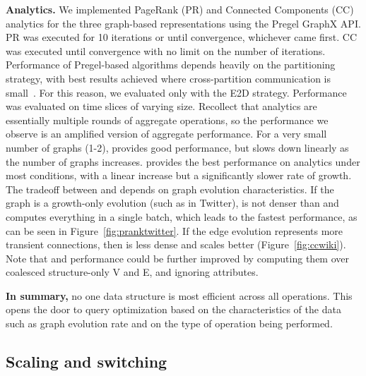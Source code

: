 {\bf Analytics.}  We implemented PageRank (PR) and Connected
Components (CC) analytics for the three graph-based representations
using the Pregel GraphX API.  PR was executed for 10 iterations or
until convergence, whichever came first. CC was executed until
convergence with no limit on the number of iterations.  Performance of
Pregel-based algorithms depends heavily on the partitioning strategy,
with best results achieved where cross-partition communication is
small~\cite{MoffittTempWeb16}.  For this reason, we evaluated only
with the E2D strategy.
%
Performance was evaluated on time slices of varying size.  Recollect
that analytics are essentially multiple rounds of aggregate
operations, so the performance we observe is an amplified version of
aggregate performance.  For a very small number of graphs (1-2), \sg
provides good performance, but slows down linearly as the number of
graphs increases.  \hg provides the best performance on analytics
under most conditions, with a linear increase but a significantly
slower rate of growth.  The tradeoff between \og and \hg depends on
graph evolution characteristics.  If the graph is a growth-only
evolution (such as in Twitter), \og is not denser than \hg and
computes everything in a single batch, which leads to the fastest
performance, as can be seen in Figure~\ref{fig:pranktwitter}.  If the
edge evolution represents more transient connections, then \hg is less
dense and scales better (Figure~\ref{fig:ccwiki}).  Note that \og and
\hg performance could be further improved by computing them over
coalesced structure-only V and E, and ignoring attributes.

{\bf In summary,} no one data structure is most efficient across all
operations.  This opens the door to query optimization based on the
characteristics of the data such as graph evolution rate and on the
type of operation being performed.  

\subsection{Scaling and switching}
\label{sec:exp:scale}

